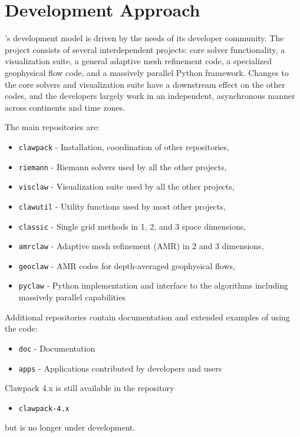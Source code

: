 %
%
%

\section{Development Approach}

\clawpack's development model is driven by the needs of its
developer community.  The \clawpack project consists of several
interdependent projects: core solver functionality, a
visualization suite, a general adaptive mesh refinement code, a
specialized geophysical flow code, and a massively parallel Python
framework.  Changes to the core solvers and visualization suite have a
downstream effect on the other codes, and the developers largely work
in an independent, asynchronous manner across continents and time
zones.

The main \clawpack repositories are:
\begin{itemize}
    \item \texttt{clawpack} - Installation, coordination of other repositories,
    \item \texttt{riemann} - Riemann solvers used by all the other projects,
    \item \texttt{visclaw} - Visualization suite used by all the other projects,
    \item \texttt{clawutil} - Utility functions used by most other projects,
    \item \texttt{classic} - Single grid methods in 1, 2, and 3 space
    dimensions,
    \item \texttt{amrclaw} - Adaptive mesh refinement (AMR) in 2 and 3 dimensions,
    \item \texttt{geoclaw} - AMR codes for depth-averaged geophysical flows,
    \item \texttt{pyclaw} - Python implementation and interface to the \clawpack algorithms including massively parallel capabilities
\end{itemize}

Additional repositories contain documentation and extended examples of
using the code: 
\begin{itemize}
    \item \texttt{doc} - Documentation
    \item \texttt{apps} - Applications contributed by developers and users
\end{itemize}
Clawpack 4.x is still available in the repository
\begin{itemize}
    \item \texttt{clawpack-4.x}
\end{itemize}
but is no longer under development.

